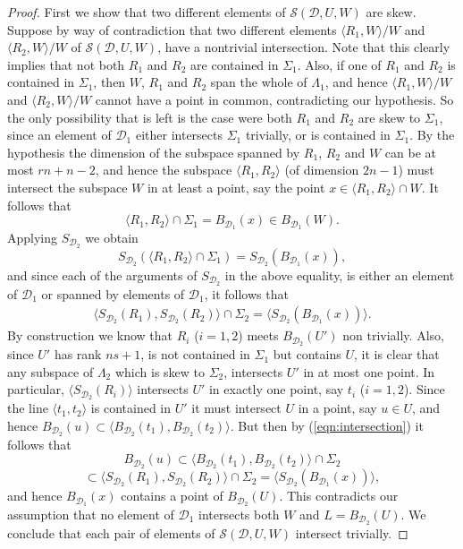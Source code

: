 \documentclass[12pt]{amsart}
\def\D{\mathcal{D}}
\begin{document}
\begin{proof}
First we show that two different elements of ${\mathcal{S}}(\D,U,W)$ are skew. Suppose by way of contradiction that two different elements $\langle R_1,W\rangle/W$ and $\langle R_2,W\rangle/W$
of  ${\mathcal{S}}(\D,U,W)$, have a nontrivial intersection. Note that this clearly implies that not both $R_1$ and $R_2$ are contained in $\Sigma_1$. Also, if one of $R_1$ and $R_2$ is contained in
$\Sigma_1$, then $W$, $R_1$ and $R_2$ span the whole of $\Lambda_1$, and hence
$\langle R_1,W\rangle/W$ and $\langle R_2,W\rangle/W$ cannot have a point in common, contradicting our hypothesis.  So the only possibility that is left is the case were both $R_1$ and $R_2$ are skew to $\Sigma_1$, since an element of $\D_1$ either intersects $\Sigma_1$ trivially, or is contained in $\Sigma_1$. By the hypothesis the dimension of the subspace spanned by $R_1$, $R_2$ and $W$ can be at most $rn+n-2$, and hence the subspace $\langle R_1,R_2\rangle$ (of dimension $2n-1$) must intersect the subspace $W$ in at least a point, say the point $x\in \langle R_1,R_2\rangle \cap W$. It follows that 
$$\langle R_1,R_2\rangle \cap \Sigma_1=B_{\D_1}(x)\in B_{\D_1}(W).$$
Applying $S_{\D_2}$ we obtain
$$S_{\D_2}(\langle R_1,R_2\rangle \cap \Sigma_1)=S_{\D_2}(B_{\D_1}(x)),$$
and since each of the arguments of $S_{\D_2}$ in the above equality, is either an element of $\D_1$ or
spanned by elements of $\D_1$, it follows that
\begin{eqnarray}\label{eqn:intersection}
\langle S_{\D_2}(R_1),S_{\D_2}(R_2)\rangle \cap \Sigma_2 =\langle S_{\D_2}(B_{\D_1}(x))\rangle.
\end{eqnarray}
By construction we know that $R_i$ ($i=1,2$) meets $B_{\D_2}(U')$ non trivially. Also, since $U'$ has rank $ns+1$, is not contained in $\Sigma_1$ but contains $U$, it is clear that
any subspace of $\Lambda_2$ which is skew to $\Sigma_2$, intersects $U'$ in at most one point. 
In particular, $\langle S_{\D_2}(R_i)\rangle$ intersects $U'$ in exactly one point, say $t_i$ ($i=1,2$). Since the line $\langle t_1,t_2\rangle$ is contained in $U'$ it must intersect $U$ in a point, say $u \in U$, and hence $B_{\D_2}(u)\subset \langle B_{\D_2}(t_1),B_{\D_2}(t_2)\rangle$. But then by (\ref{eqn:intersection}) it follows that
$$
B_{\D_2}(u)\subset \langle B_{\D_2}(t_1),B_{\D_2}(t_2)\rangle  \cap \Sigma_2
$$
$$
\subset \langle S_{\D_2}(R_1),S_{\D_2}(R_2)\rangle \cap\Sigma_2 =\langle S_{\D_2}(B_{\D_1}(x))\rangle,
$$
and hence $B_{\D_1}(x)$ contains a point of $B_{\D_2}(U)$. This contradicts our assumption that no element of 
$\D_1$ intersects both $W$ and $L=B_{\D_2}(U)$. We conclude that each pair of elements of ${\mathcal{S}}(\D,U,W)$ intersect trivially.


\end{proof}
\end{document}
